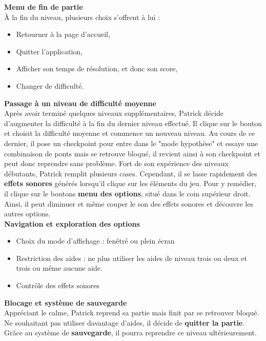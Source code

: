 \begin{mdframed}
\textbf{Menu de fin de partie}  \\
À la fin du niveau, plusieurs choix s’offrent à lui :
\begin{itemize}
    \item Retourner à la page d’accueil,
    \item Quitter l’application,
    \item Afficher son temps de résolution, et donc son score,
    \item Changer de difficulté.
\end{itemize}

\textbf{Passage à un niveau de difficulté moyenne}  \\
Après avoir terminé quelques niveaux supplémentaires, Patrick décide d’augmenter la difficulté à la fin du dernier niveau effectué. Il clique sur le bouton  et choisit la difficulté moyenne et commence un nouveau niveau. Au cours de ce dernier, il pose un checkpoint pour entre dans le "mode hypothèse" et essaye une combinaison de ponts mais se retrouve bloqué, il revient ainsi à son checkpoint et peut donc reprendre sans problème. Fort de son expérience des niveaux débutants, Patrick remplit plusieurs cases. Cependant, il se lasse rapidement des \textbf{effets sonores} générés lorsqu’il clique sur les éléments du jeu. Pour y remédier, il clique sur le boutons \textbf{menu des options}, situé dans le coin supérieur droit. Ainsi, il peut diminuer et même couper le son des effets sonores et découvre les autres options.\\

\textbf{Navigation et exploration des options} 
\begin{itemize}
    \item Choix du mode d'affichage : fenêtré ou plein écran
    \item Restriction des aides : ne plus utiliser les aides de niveau trois ou deux et trois ou même aucune aide.
    \item Contrôle des effets sonores
\end{itemize}
\textbf{Blocage et système de sauvegarde}  \\
Appréciant le calme, Patrick reprend sa partie mais finit par se retrouver bloqué. Ne souhaitant pas utiliser davantage d’aides, il décide de \textbf{quitter la partie}. Grâce au système de \textbf{sauvegarde}, il pourra reprendre ce niveau ultérieurement.
\end{mdframed}

